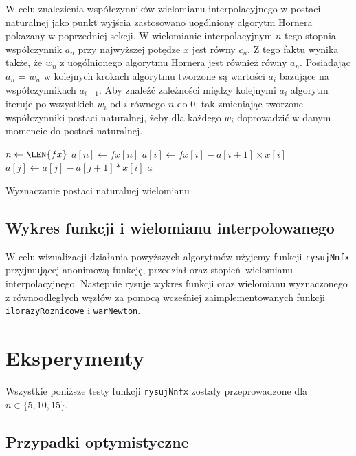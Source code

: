 \documentclass{article}
\begin{document}
W celu znalezienia współczynników wielomianu interpolacyjnego w postaci naturalnej jako punkt wyjścia zastosowano uogólniony algorytm Hornera pokazany w poprzedniej sekcji.
W wielomianie interpolacyjnym $n$-tego stopnia współczynnik $a_n$ przy najwyższej potędze $x$ jest równy $c_n$.
Z tego faktu wynika także, że  $w_n$ z uogólnionego algorytmu Hornera jest również równy $a_n$.
Posiadając $a_n$ = $w_n$ w kolejnych krokach algorytmu tworzone są wartości $a_i$ bazujące na współczynnikach $a_{i+1}$.
Aby znaleźć zależności między kolejnymi $a_i$ algorytm iteruje po wszystkich $w_i$ od $i$ równego $n$ do $0$, tak zmieniając tworzone współczynniki postaci naturalnej, żeby dla każdego $w_i$ doprowadzić w danym momencie do postaci naturalnej.


\begin{algorithm}[h]

 {
  $n \gets \LEN{fx}$\;
  $a[n] \gets fx[n]$\;
   {
    $a[i] \gets fx[i] - a[i+1] \times x[i]$\; 
     {
      $a[j] \gets a[j] - a[j+1] * x[i]$\; 	
  }	
  }
  \KwRet $a$\;
}

\caption{Wyznaczanie postaci naturalnej wielomianu}
\end{algorithm}	

\subsection{Wykres funkcji i wielomianu interpolowanego}

W celu wizualizacji działania powyższych algorytmów użyjemy funkcji \texttt{rysujNnfx} przyjmującej anonimową funkcję, przedział oraz stopień wielomianu interpolacyjnego.
Następnie rysuje wykres funkcji oraz wielomianu wyznaczonego z równoodległych węzłów za pomocą wcześniej zaimplementowanych funkcji \texttt{ilorazyRoznicowe} i \texttt{warNewton}.


\section{Eksperymenty}

Wszystkie poniższe testy funkcji \texttt{rysujNnfx} zostały przeprowadzone dla $n \in \{5,10,15\}$.

\subsection{Przypadki optymistyczne}
\end{document}

